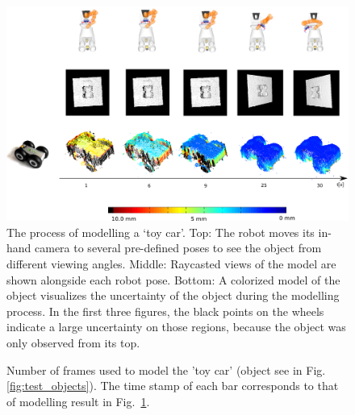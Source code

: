\begin{figure}[!htbp]
\centering
\includegraphics[width=1\linewidth]{figure/time_evolution.png}%
%
\caption{The process of modelling a `toy car'. Top: The robot moves its in-hand camera to several pre-defined poses to see the object from different viewing angles. Middle: Raycasted views of the model are shown alongside each robot pose. Bottom: A colorized model of the object visualizes the uncertainty of the object during the modelling process. In the first three figures, the black points on the wheels indicate a large uncertainty on those regions, because the object was only observed from its top.}
\label{fig:time_evolution}
\end{figure}

\begin{figure}[!htbp]
\centering
\def\svgwidth{0.7\linewidth}

\caption{Number of frames used to model the 'toy car' (object see in Fig.~ \ref{fig:test_objects}). The time stamp of each bar corresponds to that of modelling result in Fig.~\ref{fig:time_evolution}.}
\label{fig:numberofframes}
\end{figure}

